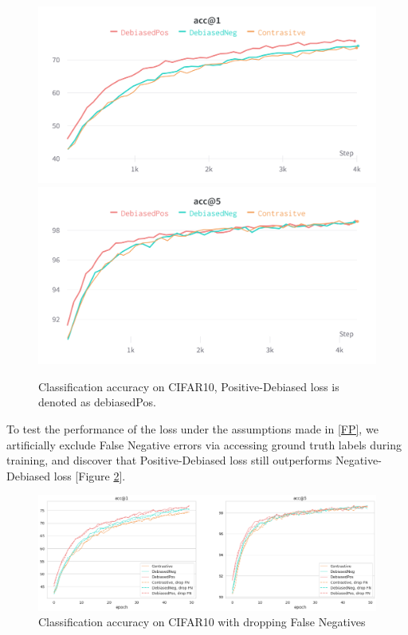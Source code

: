 \documentclass{article}
\begin{document}
\begin{figure}[!htb]
\includegraphics[width=\linewidth]{figures/3_losses.png}
\endminipage\hfill
{}
\includegraphics[width=\linewidth]{figures/3_losses_5.png}
\endminipage
\caption{Classification accuracy on CIFAR10, Positive-Debiased loss is denoted as debiasedPos.}
\label{fig:fig2}
\end{figure}

To test the performance of the loss under the assumptions made in \ref{FP}, we artificially exclude False Negative errors via accessing ground truth labels during training, and discover that Positive-Debiased loss still outperforms Negative-Debiased loss [Figure \ref{fig:fig3}].

\begin{figure}
\includegraphics[width=1\textwidth]{figures/base_vs_dropfn.png}
\caption{Classification accuracy on CIFAR10 with dropping False Negatives}
\label{fig:fig3}
\end{figure}
\end{document}
